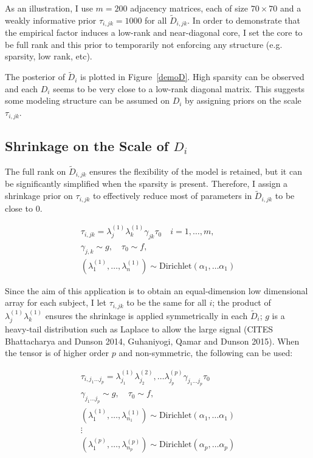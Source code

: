 \documentclass[10pt]{article}
\newcommand{\be}{\begin{equation}\begin{aligned}}
\newcommand{\ee}{\end{aligned}\end{equation}}
\begin{document}
As an illustration, I use $m=200$ adjacency matrices, each of size $70 \times 70$ and a weakly informative prior $\tau_{i,jk}=1000$ for all $\tilde D_{i,jk}$. In order to demonstrate that the empirical factor induces a low-rank and near-diagonal core, I set the core to be full rank and this prior to temporarily not enforcing any structure (e.g. sparsity, low rank, etc).

The posterior of $\tilde D_i$ is plotted in Figure~\ref{demoD}. High sparsity can be observed and each $D_i$ seems to be very close to a low-rank diagonal matrix. This suggests some modeling structure can be assumed on $D_i$ by assigning priors on the scale $\tau_{i,jk}$.

\subsection{Shrinkage on the Scale of $D_i$}

The full rank on $\tilde D_{i,jk}$ ensures the flexibility of the model is retained, but it can be significantly simplified when the sparsity is present. Therefore, I assign a shrinkage prior on $\tau_{i,jk}$ to effectively reduce most of parameters in $\tilde D_{i,jk}$ to be close to $0$.

\be
\tau_{i,jk}= \lambda^{(1)}_j \lambda^{(1)}_k \gamma_{jk}\tau_0 \quad i=1,\ldots,m,\\
\gamma_{j,k} \sim g, \quad \tau_0 \sim f,\\
(\lambda^{(1)}_1,\ldots, \lambda^{(1)}_n) \sim \text{Dirichlet} (\alpha_1, \ldots \alpha_1)
\ee

Since the aim of this application is to obtain an equal-dimension low dimensional array for each subject, I let $\tau_{i,jk}$ to be the same for all $i$; the product of $\lambda^{(1)}_j \lambda^{(1)}_k$ ensures the shrinkage is applied symmetrically in each $\tilde D_i$; $g$ is a heavy-tail distribution such as Laplace to allow the large signal (CITES Bhattacharya and Dunson 2014, Guhaniyogi, Qamar and Dunson 2015). When the tensor is of higher order $p$ and non-symmetric, the following can be used:

\be
\tau_{i,j_1\ldots j_p}= \lambda^{(1)}_{j_1} \lambda^{(2)}_{j_2}, \ldots \lambda^{(p)}_{j_p}\gamma_{j_1\ldots j_p} \tau_0\\
\gamma_{j_1\ldots j_p} \sim g, \quad \tau_0 \sim f,\\
(\lambda^{(1)}_1,\ldots, \lambda^{(1)}_{n_1}) \sim \text{Dirichlet} (\alpha_1, \ldots \alpha_1)\\
\vdots\\
(\lambda^{(p)}_1,\ldots, \lambda^{(p)}_{n_p}) \sim \text{Dirichlet} (\alpha_p, \ldots \alpha_p)
\ee
\end{document}
